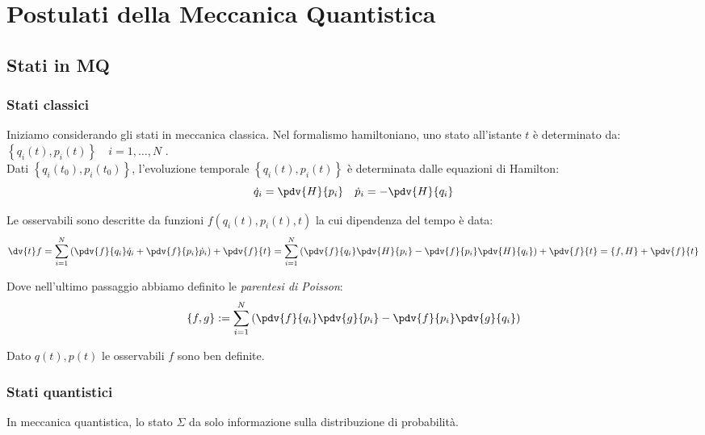 

\chapter{Postulati della Meccanica Quantistica}

\section{Stati in MQ}

\subsection{Stati classici}

Iniziamo considerando gli stati in meccanica classica.
Nel formalismo hamiltoniano, uno stato all'istante \(t\) 
è determinato da: \(\left\{ q_i(t), p_i(t) \right\}\quad i = 1,\dots, N\) .\\
Dati \(\left\{ q_i(t_0),p_i(t_0) \right\}\), l'evoluzione temporale \(\left\{ q_i(t), p_i(t)\right\}\) è determinata dalle equazioni di Hamilton:
\begin{equation}
    \dot{q}_i= \pdv{H}{p_i } \quad \dot{p}_i = -\pdv{H}{q_i }
\end{equation}

Le osservabili sono descritte da funzioni \(f(q_i(t),p_i(t),t)\) la cui dipendenza del tempo è data:
\[
\dv{t} f = \sum_{i=1}^{N} \left( \pdv{f}{q_i}\dot{q}_i+ \pdv{f}{p_i}\dot{p}_i  \right)  +\pdv{f}{t}
= \sum_{i=1}^{N} \left( \pdv{f}{q_i}\pdv{H}{p_i}-\pdv{f}{p_i}\pdv{H}{q_i} \right)+\pdv{f}{t}
= \left\{ f, H \right\} +\pdv{f}{t}
\]

Dove nell'ultimo passaggio abbiamo definito le \textit{parentesi di Poisson}:
\begin{equation}
    \left\{ f,g \right\}:= \sum_{i=1}^{N}\left( \pdv{f}{q_i}\pdv{g}{p_i}-\pdv{f}{p_i}\pdv{g}{q_i} \right)    
\end{equation}

\begin{remark}
    Dato \(q(t), p(t)\) le osservabili $f$ sono ben definite.
\end{remark}


\subsection{Stati quantistici}
In meccanica quantistica, lo stato \(\Sigma\) da solo informazione sulla distribuzione di probabilità.

